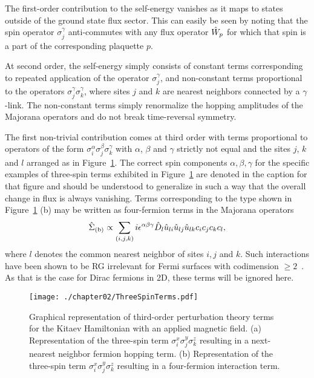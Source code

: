 The first-order contribution to the self-energy vanishes as it maps to states outside of the ground state flux sector.
This can easily be seen by noting that the spin operator $\sigma^\gamma_j$ anti-commutes with any flux operator $\hat{W}_p$ for which that spin is a part of the corresponding plaquette $p$.

At second order, the self-energy simply consists of constant terms corresponding to repeated application of the operator $\sigma_j^\gamma$, and non-constant terms proportional to the operators $\sigma_j^\gamma \sigma_k^\gamma$, where sites $j$ and $k$ are nearest neighbors connected by a $\gamma$-link.
The non-constant terms simply renormalize the hopping amplitudes of the Majorana operators and do not break time-reversal symmetry.

The first non-trivial contribution comes at third order with terms proportional to operators of the form $\sigma_i^\alpha \sigma_j^\beta \sigma_k^\gamma$ with $\alpha$, $\beta$ and $\gamma$ strictly not equal and the sites $j$, $k$ and $l$ arranged as in Figure~\ref{fig:chapter02_ThreeSpinTerms}.
The correct spin components $\alpha,\beta,\gamma$ for the specific examples of three-spin terms exhibited in Figure~\ref{fig:chapter02_ThreeSpinTerms} are denoted in the caption for that figure and should be understood to generalize in such a way that the overall change in flux is always vanishing.
Terms corresponding to the type shown in Figure~\ref{fig:chapter02_ThreeSpinTerms} (b) may be written as four-fermion terms in the Majorana operators
%
\begin{equation}
	\hat{\Sigma}_{\rm (b)} \propto \sum_{(i,j,k)} i \epsilon^{\alpha\beta\gamma} \hat{D}_l \hat{u}_{li} \hat{u}_{lj} \hat{u}_{lk} c_i c_j c_k c_l,
\end{equation}
%
where $l$ denotes the common nearest neighbor of sites $i,j$ and $k$.
Such interactions have been shown to be RG irrelevant for Fermi surfaces with codimension $\geq 2$~\cite{HermannsPRL2015}.
As that is the case for Dirac fermions in 2D, these terms will be ignored here.
%
\begin{figure}[tb]
	\centering
	\texttt{[image: ./chapter02/ThreeSpinTerms.pdf]}
	\caption{
		Graphical representation of third-order perturbation theory terms for the Kitaev Hamiltonian with an applied magnetic field.
		(a) Representation of the three-spin term $\sigma_i^x \sigma_j^y \sigma_k^z$ resulting in a next-nearest neighbor fermion hopping term.
		(b) Representation of the three-spin term $\sigma_i^x \sigma_j^y \sigma_k^z$ resulting in a four-fermion interaction term.
	}
	\label{fig:chapter02_ThreeSpinTerms}
\end{figure}
%

